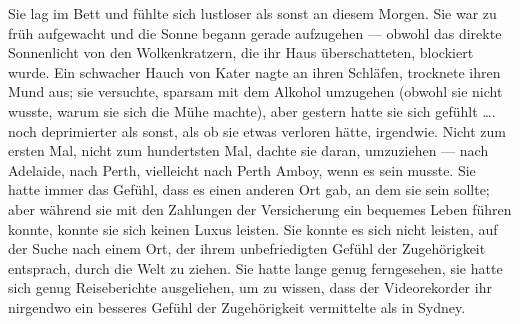 Sie lag im Bett und fühlte sich lustloser als sonst an diesem Morgen. Sie war zu früh aufgewacht und die Sonne begann gerade aufzugehen — obwohl das direkte Sonnenlicht von den Wolkenkratzern, die ihr Haus überschatteten, blockiert wurde. Ein schwacher Hauch von Kater nagte an ihren Schläfen, trocknete ihren Mund aus; sie versuchte, sparsam mit dem Alkohol umzugehen (obwohl sie nicht wusste, warum sie sich die Mühe machte), aber gestern hatte sie sich gefühlt …. noch deprimierter als sonst, als ob sie etwas verloren hätte, irgendwie.
Nicht zum ersten Mal, nicht zum hundertsten Mal, dachte sie daran, umzuziehen — nach Adelaide, nach Perth, vielleicht nach Perth Amboy, wenn es sein musste. Sie hatte immer das Gefühl, dass es einen anderen Ort gab, an dem sie sein sollte; aber während sie mit den Zahlungen der Versicherung ein bequemes Leben führen konnte, konnte sie sich keinen Luxus leisten. Sie konnte es sich nicht leisten, auf der Suche nach einem Ort, der ihrem unbefriedigten Gefühl der Zugehörigkeit entsprach, durch die Welt zu ziehen. Sie hatte lange genug ferngesehen, sie hatte sich genug Reiseberichte ausgeliehen, um zu wissen, dass der Videorekorder ihr nirgendwo ein besseres Gefühl der Zugehörigkeit vermittelte als in Sydney.

